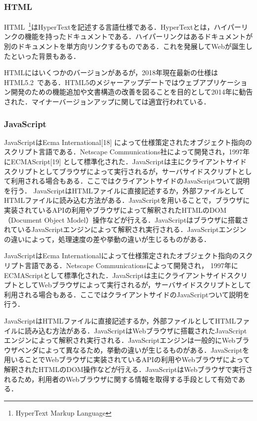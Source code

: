 \subsubsection{HTML}
HTML~\footnote{HyperText Markup Language}はHyperTextを記述する言語仕様である．HyperTextとは，ハイパーリンクの機能を持ったドキュメントである．ハイパーリンクはあるドキュメントが別のドキュメントを単方向リンクするものである．これを発展してWebが誕生したといった背景もある．

HTMLにはいくつかのバージョンがあるが，2018年現在最新の仕様はHTML5.2~\cite{html5_2}である．HTML5のメジャーアップデートではウェブアプリケーション開発のための機能追加や文書構造の改善を図ることを目的として2014年に勧告された．マイナーバージョンアップに関しては適宜行われている．
\subsubsection{JavaScript}
JavaScriptはEcma International[18] によって仕様策定されたオブジェクト指向のスクリプト言語である．Netscape Communications社によって開発され，1997年にECMAScript[19] として標準化された．JavaScriptは主にクライアントサイドスクリプトとしてブラウザによって実行されるが，サーバサイドスクリプトとして利用される場合もある．ここではクライアントサイドのJavaScriptついて説明を行う．
JavaScriptはHTMLファイルに直接記述するか，外部ファイルとしてHTMLファイルに読み込む方法がある．JavaScriptを用いることで，ブラウザに実装されているAPIの利用やブラウザによって解釈されたHTMLのDOM（Document Object Model）操作などが行える．JavaScriptはブラウザに搭載されているJavaScriptエンジンによって解釈され実行される．JavaScriptエンジンの違いによって，処理速度の差や挙動の違いが生じるものがある．


JavaScriptはEcma Internationalによって仕様策定されたオブジェクト指向のスクリプト言語である．Netscape Communicationsによって開発され， 1997年にECMAScriptとして標準化された．JavaScriptは主にクライアントサイドスクリプトとしてWebブラウザによって実行されるが，サーバサイドスクリプトとして利用される場合もある．ここではクライアントサイドのJavaScriptついて説明を行う．

JavaScriptはHTMLファイルに直接記述するか，外部ファイルとしてHTMLファイルに読み込む方法がある．JavaScriptはWebブラウザに搭載されたJavaScriptエンジンによって解釈され実行される．JavaScriptエンジンは一般的にWebブラウザベンダによって異なるため，挙動の違いが生じるものがある．JavaScriptを用いることでWebブラウザに実装されているAPIの利用やWebブラウザによって解釈されたHTMLのDOM操作などが行える．JavaScriptはWebブラウザで実行されるため，利用者のWebブラウザに関する情報を取得する手段として有効である．

